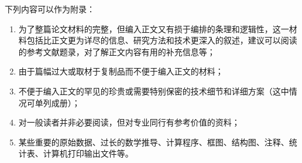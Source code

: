 \appendix

下列内容可以作为附录：

\begin{enumerate}[label=\arabic*)]
\item 为了整篇论文材料的完整，但编入正文又有损于编排的条理和逻辑性，这一材料包括比正文更为详尽的信息、研究方法和技术更深入的叙述，建议可以阅读的参考文献题录，对了解正文内容有用的补充信息等；
\item 由于篇幅过大或取材于复制品而不便于编入正文的材料；
\item 不便于编入正文的罕见的珍贵或需要特别保密的技术细节和详细方案（这中情况可单列成册）；
\item 对一般读者并非必要阅读，但对专业同行有参考价值的资料；
\item 某些重要的原始数据、过长的数学推导、计算程序、框图、结构图、注释、统计表、计算机打印输出文件等。
\end{enumerate}